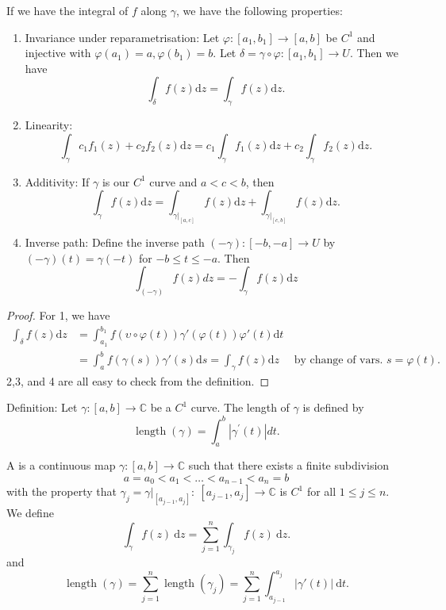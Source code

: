 \documentclass[egregdoesnotlikesansseriftitles,a4paper]{scrartcl}
\begin{document}
\begin{proposition}
      If we have the integral of $f$ along $\gamma$, we have the following properties: 
      \begin{enumerate}
           \item Invariance under reparametrisation: Let $\varphi: [a_1 ,b_1 ] \rightarrow [a,b]$ be $C^1$ and injective with $\varphi (a_1 )=a, \varphi (b_1 )=b.$ Let $\delta= \gamma \circ \varphi : [a_1 ,b_1] \rightarrow U$. Then we have \[
           \int_{\delta}^{}f (z) \mathrm{d}z= \int_{\gamma}^{}f (z) \mathrm{d}z  
           .\]  
           \item Linearity: \[
           \int_{\gamma}^{}c_1 f_1 (z)+ c_2 f_2 (z) \mathrm{d}z= c_1 \int_{\gamma}^{}f_1 (z) \mathrm{d}z +c_2  \int_{\gamma}^{}f_2 (z) \mathrm{d}z 
           .\] 
           \item Additivity: If $\gamma$ is our $C^1$ curve and $a<c<b$, then \[
           \int_{\gamma}^{}f (z) \mathrm{d}z = \int_{\gamma|_[a,c]}^{}f (z) \mathrm{d}z + \int_{\gamma|_[c,b]}^{}f (z) \mathrm{d}z  
           .\] 
           \item Inverse path: Define the inverse path $(-\gamma):[-b,-a] \rightarrow U$ by $(-\gamma)(t)=\gamma(-t)$ for $-b \leq t \leq-a$. Then
           $$
           \int_{(-\gamma)} f(z) d z=-\int_{\gamma} f(z) \mathrm{d} z
           $$
      \end{enumerate}
\end{proposition}
\begin{proof}
     For 1, we have 
     \begin{align*}
          \int_{\delta}^{}f (z) \mathrm{d}z &= \int_{a_1 }^{b_1 }f (\upsilon \circ \varphi (t)) \gamma' (\varphi (t))\varphi' (t) \mathrm{d}t \\
          &=\int_{a}^{b}f (\gamma (s))\gamma' (s) \mathrm{d}s = \int_{\gamma}^{}f (z) \mathrm{d}z \quad \text{ by change of vars. } s=\varphi (t).
      \end{align*}
      2,3, and 4 are all easy to check from the definition.
\end{proof}
\begin{definition*}
     Definition: Let $\gamma:[a, b] \rightarrow \mathbb{C}$ be a $C^{1}$ curve. The length of $\gamma$ is defined by
     $$
     \operatorname{length}(\gamma)=\int_{a}^{b}\left|\gamma^{\prime}(t)\right| d t.
     $$
\end{definition*}
\begin{definition*}
      A  is a continuous map $\gamma: [a,b] \rightarrow \mathbb{C}$ such that there exists a finite subdivision \[
      a=a_0 <a_1 < \ldots <a_{n-1}<a_{n}=b
      \] with the property that $\gamma_{j}=\gamma|_{[a_{j-1},a_j]}: \ [a_{j-1},a_j] \rightarrow \mathbb{C}$ is $C^{1}$ for all $1 \leq j \leq n$. We define \[
      \int_{\gamma}^{}f (z) \ \mathrm{d} z= \sum_{j=1}^{n} \int_{\gamma_{j}}^{}f (z) \ \mathrm{d}z 
      .\] 
      and \[
          \operatorname{length}(\gamma)=\sum_{j=1}^{n}\operatorname{length}(\gamma_{j})=\sum_{j=1}^{n}\int_{a_{j-1}}^{a_j}|\gamma' (t)| \ \mathrm{d}t 
      .\] 
\end{definition*}
\end{document}
